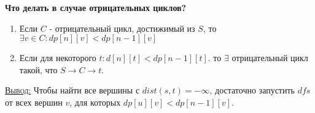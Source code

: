 \textbf{Что делать в случае отрицательных циклов?}

\begin{proposition}
  \begin{enumerate}
    \item Если $C$ - отрицательный цикл, достижимый из $S$, то $\exists v \in C: dp[n][v] < dp[n - 1][v]$
    \item Если для некоторого $t: d[n][t] < dp[n - 1][t]$. то $\exists$ отрицательный цикл такой, что $S \to C \to t$.
  \end{enumerate}
\end{proposition}

\underline{\textsc{Вывод:}} Чтобы найти все вершины с $dist(s, t) = -\infty$, достаточно запустить $dfs$ от всех вершин $v$, для которых $dp[u][v] < dp[n - 1][v]$.
